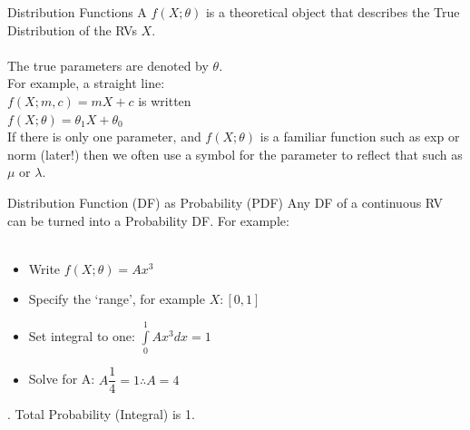 \documentclass[10pt,sans,english,compress,xcolor=dvipsnames]{beamer}
\begin{document}
\begin{frame}{Distribution Functions}
A  $f(X;\theta)$ is a theoretical object that describes the True Distribution of the RVs $X$. \\[1ex]
\\[1ex]
The true parameters are denoted by $\theta$.\\[1ex]
For example, a straight line:\\[1ex]
 $f(X;m,c) =mX+c$ is written\\[1ex]
 $f(X;\theta) =\theta_1 X+ \theta_0$\\[2ex]
If there is only one parameter, and $f(X;\theta)$ is a familiar function such as exp or norm (later!) then we often use a symbol for the parameter to reflect that such as $\mu$ or $\lambda$.\\
\end{frame}

\begin{frame}{Distribution Function (DF) as Probability (PDF)}
Any DF of a continuous RV can be turned into a Probability DF. For example: \\[1ex]
\\[1ex]
\begin{itemize}
\item[1] Write $f(X;\theta) = A x^3$\\[1ex]
\item[2] Specify the `range', for example $X:[0,1]$\\[1ex]
\item[3] Set integral to one: $\int\limits_0^1   A x^3 dx =1$\\[1ex]
\item[4] Solve for A:  $A \dfrac{1}{4} =1 \therefore A= 4 $\\[2ex]
\end{itemize} 
. Total Probability (Integral) is 1.\\[1ex]

\end{frame} 
\end{document}
